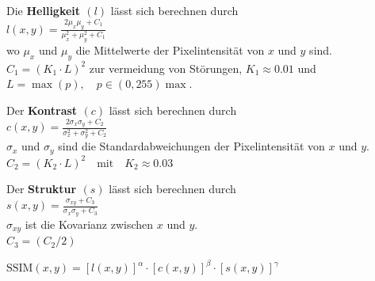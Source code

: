             \begin{center}    
                Die \textbf{Helligkeit $(l)$} \vspace{1mm} lässt sich berechnen durch \\
                $l(x, y) = \frac{2 \mu_x \mu_y + C_1}{\mu_x^2 + \mu_y^2 + C_1}$ \vspace{1mm}\\
                wo $\mu_x$ und $\mu_y$ die Mittelwerte der Pixelintensität von $x$ und $y$ sind.\\
                $C_1 = (K_1 \cdot L)^2$ zur vermeidung von Störungen, $K_1 \approx 0.01$ und
                $L = \max(p), \quad p \in (0, 255) \max$.\\
            \end{center}
            \begin{center}    
                Der \textbf{Kontrast $(c)$} \vspace{1mm} lässt sich berechnen durch \\
                $c(x, y) = \frac{2 \sigma_x \sigma_y + C_2}{\sigma_x^2 + \sigma_y^2 + C_2}$ \vspace{1mm}\\
                $\sigma_x$ und $\sigma_y$ sind die Standardabweichungen der Pixelintensität von $x$ und $y$.\\
                $C_2 = (K_2 \cdot L)^2 \quad \text{mit} \quad K_2 \approx 0.03$
            \end{center}
            \begin{center}    
                Der \textbf{Struktur  $(s)$} \vspace{1mm} lässt sich berechnen durch \\
                $s(x, y) = \frac{\sigma_{xy} + C_3}{\sigma_x \sigma_y + C_3}$ \vspace{1mm}\\
                $\sigma_{xy}$ ist die Kovarianz zwischen $x$ und $y$.\\
                $C_3 = (C_2 / 2)$
            \end{center}
            
            \begin{center}    
                $\text{SSIM}(x, y) = [l(x, y)]^\alpha \cdot [c(x, y)]^\beta \cdot [s(x, y)]^\gamma$
            \end{center}
       
